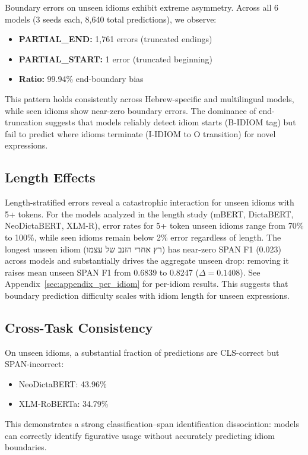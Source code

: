 \documentclass[11pt]{article}
\begin{document}
Boundary errors on unseen idioms exhibit extreme asymmetry. Across all 6 models (3 seeds each, 8,640 total predictions), we observe:
\begin{itemize}
    \item \textbf{PARTIAL\_END:} 1,761 errors (truncated endings)
    \item \textbf{PARTIAL\_START:} 1 error (truncated beginning)
    \item \textbf{Ratio:} 99.94\% end-boundary bias
\end{itemize}

This pattern holds consistently across Hebrew-specific and multilingual models, while seen idioms show near-zero boundary errors. The dominance of end-truncation suggests that models reliably detect idiom starts (B-IDIOM tag) but fail to predict where idioms terminate (I-IDIOM to O transition) for novel expressions.

\subsection{Length Effects}

Length-stratified errors reveal a catastrophic interaction for unseen idioms with 5+ tokens. For the models analyzed in the length study (mBERT, DictaBERT, NeoDictaBERT, XLM-R), error rates for 5+ token unseen idioms range from 70\% to 100\%, while seen idioms remain below 2\% error regardless of length. The longest unseen idiom (\foreignlanguage{hebrew}{רץ אחרי הזנב של עצמו}) has near-zero SPAN F1 (0.023) across models and substantially drives the aggregate unseen drop: removing it raises mean unseen SPAN F1 from 0.6839 to 0.8247 ($\Delta{=}0.1408$). See Appendix~\ref{sec:appendix_per_idiom} for per-idiom results. This suggests that boundary prediction difficulty scales with idiom length for unseen expressions.

\subsection{Cross-Task Consistency}

On unseen idioms, a substantial fraction of predictions are CLS-correct but SPAN-incorrect:
\begin{itemize}
    \item NeoDictaBERT: 43.96\%
    \item XLM-RoBERTa: 34.79\%
\end{itemize}
This demonstrates a strong classification--span identification dissociation: models can correctly identify figurative usage without accurately predicting idiom boundaries.
\end{document}
